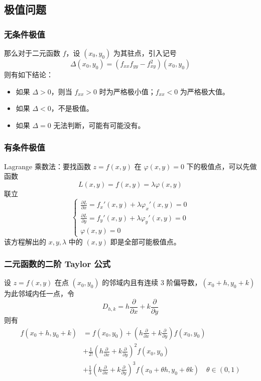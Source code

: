 \subsection{极值问题}

\subsubsection*{无条件极值}

那么对于二元函数 $f$，设 $(x_0, y_0)$ 为其驻点，引入记号
\[ \Delta(x_0, y_0) = (f_{xx} f_{yy} - f_{xy}^2)(x_0, y_0) \]
则有如下结论：
\begin{itemize}
	\item 如果 $\Delta > 0$，则当 $f_{xx} > 0$ 时为严格极小值；$f_{xx} < 0$ 为严格极大值。
	\item 如果 $\Delta < 0$，不是极值。
	\item 如果 $\Delta = 0$ 无法判断，可能有可能没有。
\end{itemize}

\subsubsection*{有条件极值}

Lagrange 乘数法：要找函数 $z = f(x, y)$ 在 $\varphi(x, y) = 0$ 下的极值点，可以先做函数
\[ L(x, y) = f(x, y) = \lambda \varphi(x, y) \]
联立
\[ \begin{cases}
		\frac{\partial L}{\partial x} = f_x'(x,y) + \lambda \varphi_x'(x, y) = 0 \\
		\frac{\partial L}{\partial y} = f_y'(x,y) + \lambda \varphi_y'(x, y) = 0 \\
		\varphi(x, y) = 0
	\end{cases} \]
该方程解出的 $x, y, \lambda$ 中的 $(x, y)$ 即是全部可能极值点。


\subsubsection*{二元函数的二阶 Taylor 公式}

\begin{theorem}
	设 $z = f(x, y)$ 在点 $(x_0, y_0)$ 的邻域内且有连续 $3$ 阶偏导数，$(x_0 + h, y_0 + k)$ 为此邻域内任一点，令
	\[ D_{h,k} = h \frac{\partial}{\partial x} + k \frac{\partial}{\partial y} \]
	则有
	\[
		\begin{aligned}
			f(x_0 + h, y_0 + k) & = f(x_0, y_0) + \left(h \frac{\partial}{\partial x} + k \frac{\partial}{\partial y}\right) f(x_0, y_0)                                               \\
			                    & + \frac{1}{2!} \left(h \frac{\partial}{\partial x} + k \frac{\partial}{\partial y}\right)^2 f(x_0, y_0)                                              \\
			                    & + \frac{1}{3} \left(h \frac{\partial}{\partial x} + k \frac{\partial}{\partial y}\right)^3 f(x_0 + \theta h, y_0 + \theta k) \quad \theta \in (0, 1) \\
		\end{aligned}
	\]
\end{theorem}

